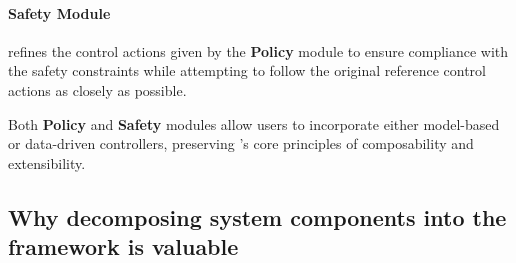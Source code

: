 \paragraph{\textbf{Safety Module}} refines the control actions given by the \textbf{Policy} module to ensure compliance with the safety constraints while attempting to follow the original reference control actions as closely as possible. 

Both \textbf{Policy} and \textbf{Safety} modules allow users to incorporate either model-based or data-driven controllers, preserving \spark's core principles of composability and extensibility.



\subsection{Why decomposing system components into the \spark framework is valuable}

